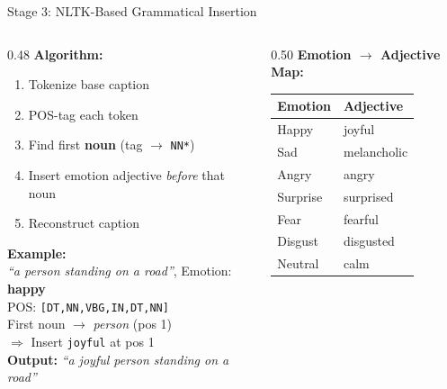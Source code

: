 \documentclass{beamer}
\begin{document}
\begin{frame}{Stage 3: NLTK-Based Grammatical Insertion}

\begin{columns}[T]
\begin{column}{0.48\textwidth}
    \textbf{Algorithm:}
    \begin{enumerate}
        \item Tokenize base caption
        \item POS-tag each token
        \item Find first \textbf{noun} (tag $\rightarrow$ \texttt{NN*})
        \item Insert emotion adjective \textit{before} that noun
        \item Reconstruct caption
    \end{enumerate}
    \vspace{0.3cm}
    \textbf{Example:}\\
    \small
    \textit{``a person standing on a road''}, Emotion: \textbf{happy}\\[0.2em]
    POS: \texttt{[DT,NN,VBG,IN,DT,NN]}\\
    First noun $\rightarrow$ \textit{person} (pos 1)\\
    $\Rightarrow$ Insert \texttt{joyful} at pos 1\\[0.2em]
    \textbf{Output:} \textit{``a joyful person standing on a road''}
\end{column}

\begin{column}{0.50\textwidth}
    \textbf{Emotion $\to$ Adjective Map:}\\[0.3em]
    \begin{center}
    \small
    \begin{tabular}{ll}
    \toprule
    \textbf{Emotion} & \textbf{Adjective} \\
    \midrule
    Happy    & joyful \\
    Sad      & melancholic \\
    Angry    & angry \\
    Surprise & surprised \\
    Fear     & fearful \\
    Disgust  & disgusted \\
    Neutral  & calm \\
    \bottomrule
    \end{tabular}
    \end{center}
\end{column}
\end{columns}

\end{frame}
\end{document}
